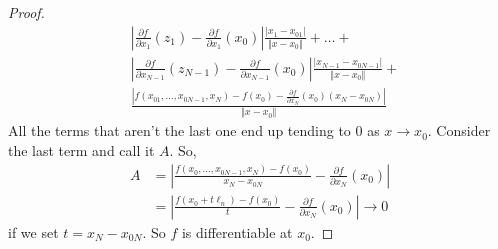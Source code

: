 \documentclass{report}
\begin{document}
\begin{proof}
\begin{align*}
        &\left| \frac{\partial f}{\partial x_1} (z_1)- \frac{\partial f}{\partial x_1}(x_0)\right| \frac{|x_1 - x_{01}|}{\Vert x - x_0 \Vert} + \ldots + \\
        &\left| \frac{\partial f}{\partial x_{N-1}} (z_{N-1})- \frac{\partial f}{\partial x_{N-1}}(x_0)\right| \frac{|x_{N-1} - x_{0N-1}|}{\Vert x - x_0 \Vert} + \\
        &\frac{|f(x_{01}, \ldots, x_{0N-1}, x_N) - f(x_0) - \frac{\partial f}{\partial x_N}(x_0)(x_N - x_{0N})|}{\Vert x - x_0 \Vert}
    \end{align*}
    All the terms that aren't the last one end up tending to 0 as $x \to x_0$. Consider the last term and call it $A$. So,
    \begin{align*}
        A &= \left| \frac{ f(x_0, \ldots, x_{0N-1}, x_N) - f(x_0) }{x_N - x_{0N}} - \frac{\partial f}{\partial x_N}(x_0) \right| \\
        &= \left| \frac{f(x_0 + t \ell_n) - f(x_0)}{t} - \frac{\partial f}{\partial x_N}(x_0) \right| \to 0
    \end{align*}
    if we set $t = x_N - x_{0N}$. So $f$ is differentiable at $x_0$.
\end{proof}
\newpage
\end{document}
